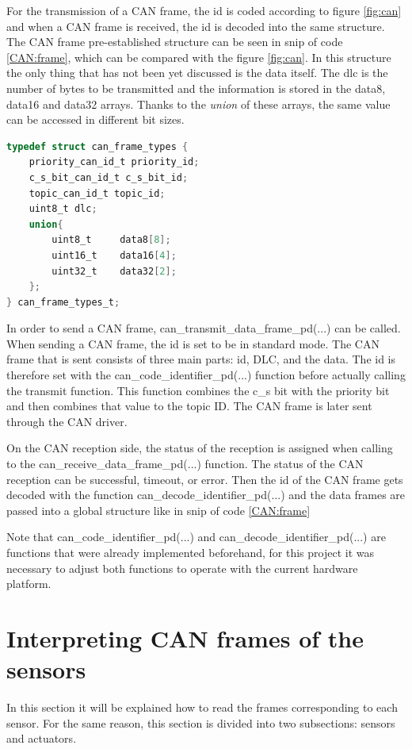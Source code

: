 \documentclass[12pt]{report}%
\begin{document}
For the transmission of a CAN frame, the id is coded according to figure \ref{fig:can} and when a CAN frame is received, the id is decoded into the same structure. The CAN frame pre-established structure can be seen in snip of code \ref{CAN:frame}, which can be compared with the figure \ref{fig:can}. In this structure the only thing that has not been yet discussed is the data itself. The dlc is the number of bytes to be transmitted and the information is stored in the data8, data16 and data32 arrays. Thanks to the \textit{union} of these arrays, the same value can be accessed in different bit sizes.

\begin{minipage}{\linewidth}
\begin{lstlisting}[caption = CAN frame, label = CAN:frame, language = C, captionpos = b]
typedef struct can_frame_types {
    priority_can_id_t priority_id;
    c_s_bit_can_id_t c_s_bit_id;
    topic_can_id_t topic_id;
    uint8_t dlc;
    union{
        uint8_t     data8[8];
        uint16_t    data16[4];
        uint32_t    data32[2];
    };
} can_frame_types_t;
\end{lstlisting}
\end{minipage}

In order to send a CAN frame, can\_transmit\_data\_frame\_pd(...) can be called. When sending a CAN frame, the id is set to be in standard mode. The CAN frame that is sent consists of three main parts: id, DLC, and the data. The id is therefore set with the can\_code\_identifier\_pd(...) function before actually calling the transmit function. This function combines the c\_s bit with the priority bit and then combines that value to the topic ID. The CAN frame is later sent through the CAN driver.

On the CAN reception side, the status of the reception is assigned when calling to the can\_receive\_data\_frame\_pd(...) function. The status of the CAN reception can be successful, timeout, or error. Then the id of the CAN frame gets decoded with the function can\_decode\_identifier\_pd(...) and the data frames are passed into a global structure like in snip of code \ref{CAN:frame}

Note that can\_code\_identifier\_pd(...) and can\_decode\_identifier\_pd(...) are functions that were already implemented beforehand, for this project it was necessary to adjust both functions to operate with the current hardware platform.

\section{Interpreting CAN frames of the sensors}
\label{sec:sensorout}
In this section it will be explained how to read the frames corresponding to each sensor. For the same reason, this section is divided into two subsections: sensors and actuators.
\end{document}
